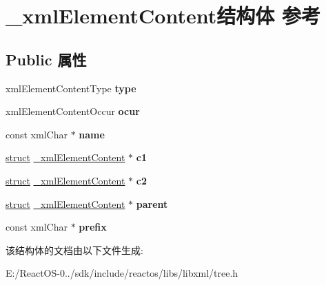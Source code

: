 \hypertarget{struct__xml_element_content}{}\section{\+\_\+xml\+Element\+Content结构体 参考}
\label{struct__xml_element_content}
\subsection*{Public 属性}
\begin{DoxyCompactItemize}
\item 
\mbox{\label{struct__xml_element_content_a9ec31227deddf6cb534eaba958cc8a2a}} 
xml\+Element\+Content\+Type {\bfseries type}
\item 
\mbox{\label{struct__xml_element_content_a45c3092e58963270a4c9640016b61ce3}} 
xml\+Element\+Content\+Occur {\bfseries ocur}
\item 
\mbox{\label{struct__xml_element_content_ad383369c8a49f1cb3999439c62c9f98f}} 
const xml\+Char $\ast$ {\bfseries name}
\item 
\mbox{\label{struct__xml_element_content_af125e186de93fc51a627314d7d19fd83}} 
\hyperlink{interfacestruct}{struct} \hyperlink{struct__xml_element_content}{\+\_\+xml\+Element\+Content} $\ast$ {\bfseries c1}
\item 
\mbox{\label{struct__xml_element_content_a198db6da2997f0b080b90cd5e810abc7}} 
\hyperlink{interfacestruct}{struct} \hyperlink{struct__xml_element_content}{\+\_\+xml\+Element\+Content} $\ast$ {\bfseries c2}
\item 
\mbox{\label{struct__xml_element_content_af3f9d19c234e96d250039a2c614fe135}} 
\hyperlink{interfacestruct}{struct} \hyperlink{struct__xml_element_content}{\+\_\+xml\+Element\+Content} $\ast$ {\bfseries parent}
\item 
\mbox{\label{struct__xml_element_content_acd325785e618ba78d92a889e134bc287}} 
const xml\+Char $\ast$ {\bfseries prefix}
\end{DoxyCompactItemize}


该结构体的文档由以下文件生成\+:\begin{DoxyCompactItemize}
\item 
E\+:/\+React\+O\+S-\/0../sdk/include/reactos/libs/libxml/tree.\+h\end{DoxyCompactItemize}
